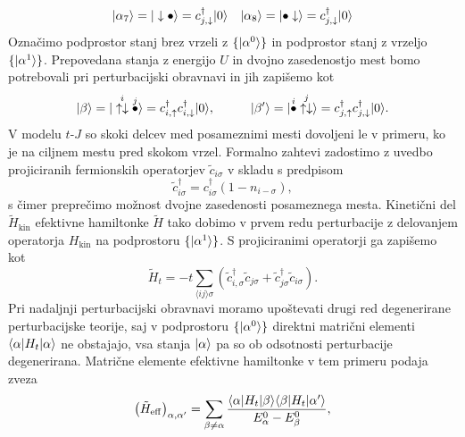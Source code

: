 \begin{appendices}
\begin{equation}
\begin{aligned}
&\vert\alpha_7\rangle=\vert\downarrow \bullet\rangle=c^\dagger_{j,\downarrow}\vert0\rangle&\vert\alpha_8\rangle=\vert \bullet  \downarrow \rangle=c^\dagger_{j,\downarrow}\vert0\rangle\\
\end{aligned}
\end{equation}
Označimo podprostor stanj brez vrzeli z $\{ \vert\alpha^0\rangle\}$ in podprostor stanj z vrzeljo $\{ \vert\alpha^1\rangle\}$.
Prepovedana stanja z energijo $U$ in dvojno zasedenostjo mest bomo potrebovali pri perturbacijski obravnavi in jih zapišemo  kot 
\begin{equation}\label{eq:vzbujena}
\ket{\beta}=\ket{ \overset{i}{\uparrow\downarrow}\overset{j}{\bullet}}=c^\dagger_{i,\uparrow}c^\dagger_{i,\downarrow}\ket{0}, \hspace{10mm} 
\ket{\beta'}=\ket{\overset{i}{\bullet}\overset{j}{\uparrow\downarrow}}=c^\dagger_{j,\uparrow}c^\dagger_{j,\downarrow}\ket{0}.
\end{equation}
 V modelu $t$-$J$ so skoki delcev med posameznimi mesti dovoljeni le v primeru, ko je na ciljnem mestu pred skokom vrzel. Formalno zahtevi zadostimo z uvedbo projiciranih fermionskih operatorjev $\tilde{c}_{i\sigma}$ v skladu s predpisom 
\begin{equation}\label{eq:projicirani}
\tilde{c}^\dagger_{i\sigma}= c^\dagger_{i\sigma} \left(1-n_{i-\sigma}\right),
\end{equation}
s čimer preprečimo možnost dvojne zasedenosti posameznega mesta. Kinetični del $\tilde{H}_\mathrm{kin}$ efektivne hamiltonke $\tilde{H}$ tako dobimo v prvem redu perturbacije z delovanjem operatorja $H_\mathrm{kin}$ na podprostoru $\{ \vert\alpha^1\rangle \}$. S projiciranimi operatorji ga zapišemo kot 
\begin{equation}\label{eq:ef_kin}
\tilde{H}_t=-t\sum\limits_{\langle ij \rangle \sigma} \left(\tilde{c}^\dagger_{i,\sigma} \tilde{c}_{j\sigma} + \tilde{c}^\dagger_{j\sigma}\tilde{c}_{i\sigma}\right).
\end{equation}
Pri nadaljnji perturbacijski obravnavi moramo upoštevati drugi red degenerirane perturbacijske teorije, saj v podprostoru $\{ \vert\alpha^0\rangle\}$ direktni matrični elementi $\langle \alpha \vert H_t \vert\alpha\rangle$ ne obstajajo, vsa stanja $\vert\alpha\rangle$ pa so ob odsotnosti perturbacije degenerirana. 
Matrične elemente efektivne hamiltonke v tem primeru podaja zveza 
\begin{equation}
\left(\tilde{H}_\mathrm{eff}\right)_{\alpha, \alpha'}=\sum\limits_{\beta\neq\alpha}\frac{\bra{\alpha}H_t\ket{\beta}\bra{\beta}H_t\ket{\alpha'}}{E_\alpha^0 - E_\beta^0},

\end{equation}
\end{appendices}
